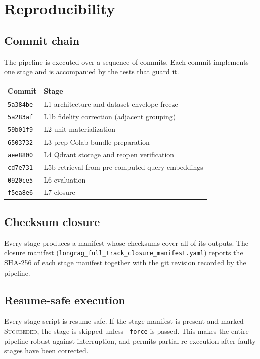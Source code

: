 \documentclass[11pt,a4paper]{article}
\begin{document}
\section{Reproducibility}\label{sec:repro}

\subsection{Commit chain}
The pipeline is executed over a sequence of commits. Each commit
implements one stage and is accompanied by the tests that guard it.

\begin{center}
\small
\begin{tabular}{l l}
\toprule
\textbf{Commit} & \textbf{Stage} \\
\midrule
\texttt{5a384be} & L1 architecture and dataset-envelope freeze \\
\texttt{5a283af} & L1b fidelity correction (adjacent grouping) \\
\texttt{59b01f9} & L2 unit materialization \\
\texttt{6503732} & L3-prep Colab bundle preparation \\
\texttt{aee8800} & L4 Qdrant storage and reopen verification \\
\texttt{cd7e731} & L5b retrieval from pre-computed query embeddings \\
\texttt{0920ce5} & L6 evaluation \\
\texttt{f5ea8e6} & L7 closure \\
\bottomrule
\end{tabular}
\end{center}

\subsection{Checksum closure}
Every stage produces a manifest whose checksums cover all of its
outputs. The closure manifest
(\texttt{longrag\_full\_track\_closure\_manifest.yaml}) reports the
SHA-256 of each stage manifest together with the git revision
recorded by the pipeline.

\subsection{Resume-safe execution}
Every stage script is resume-safe. If the stage manifest is present
and marked \textsc{Succeeded}, the stage is skipped unless
\texttt{--force} is passed. This makes the entire pipeline robust
against interruption, and permits partial re-execution after
faulty stages have been corrected.
\end{document}
